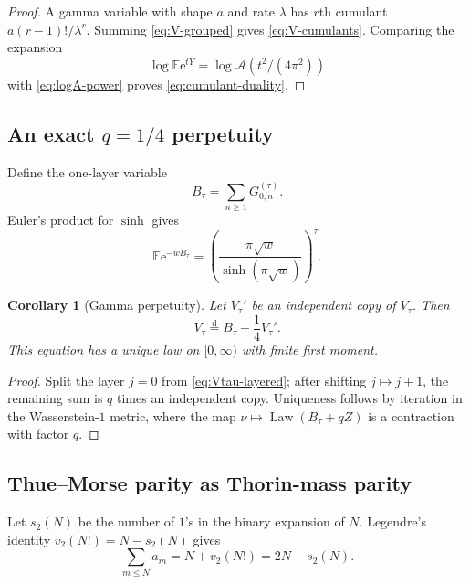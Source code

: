 \documentclass[11pt,oneside]{article}
\newtheorem{corollary}[theorem]{Corollary}
\theoremstyle{definition}
\theoremstyle{remark}
\newcommand{\e}{\mathrm e}
\newcommand{\E}{\mathbb E}
\newcommand{\Law}{\operatorname{Law}}
\newcommand{\dist}{\mathrel{\stackrel{\mathrm d}=}}
\begin{document}
\begin{proof}
A gamma variable with shape $a$ and rate $\lambda$ has $r$th cumulant
$a(r-1)!/\lambda^r$.  Summing \cref{eq:V-grouped} gives
\cref{eq:V-cumulants}.  Comparing the expansion
\[
 \log\E\e^{tY}=\log\mathcal A(t^2/(4\pi^2))
\]
with \cref{eq:logA-power} proves \cref{eq:cumulant-duality}.
\end{proof}

\subsection{An exact $q=1/4$ perpetuity}

Define the one-layer variable
\begin{equation}\label{eq:Btau}
 B_\tau=\sum_{n\ge1}G_{0,n}^{(\tau)}.
\end{equation}
Euler's product for $\sinh$ gives
\begin{equation}\label{eq:B-LT}
 \E\e^{-wB_\tau}
 =\left(\frac{\pi\sqrt w}{\sinh(\pi\sqrt w)}\right)^\tau.
\end{equation}

\begin{corollary}[Gamma perpetuity]\label{cor:perpetuity}
Let $V_\tau'$ be an independent copy of $V_\tau$.  Then
\begin{equation}\label{eq:perpetuity}
 \boxed{V_\tau\dist B_\tau+\frac14V_\tau'.}
\end{equation}
This equation has a unique law on $[0,\infty)$ with finite first moment.
\end{corollary}

\begin{proof}
Split the layer $j=0$ from \cref{eq:Vtau-layered}; after shifting
$j\mapsto j+1$, the remaining sum is $q$ times an independent copy.  Uniqueness
follows by iteration in the Wasserstein-$1$ metric, where the map
$\nu\mapsto\Law(B_\tau+qZ)$ is a contraction with factor $q$.
\end{proof}

\subsection{Thue--Morse parity as Thorin-mass parity}

Let $s_2(N)$ be the number of $1$'s in the binary expansion of $N$.
Legendre's identity $v_2(N!)=N-s_2(N)$ gives
\begin{equation}\label{eq:cumulative-a}
 \sum_{m\le N}a_m=N+v_2(N!)=2N-s_2(N).
\end{equation}
\end{document}
